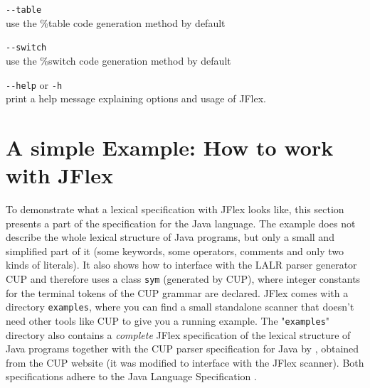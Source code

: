 \documentclass[11pt]{scrartcl}
\newcommand{\trit}{\em}
\begin{document}
\begin{description}
\item \verb+--table+\\
  use the \%table code generation method by default

\item \verb+--switch+\\
  use the \%switch code generation method by default

\item \verb+--help+ or \texttt{-h}\\
  print a help message explaining options and usage of JFlex.
\end{description}

\section{A simple Example: How to work with JFlex\label{Example}}
To demonstrate what a lexical specification with JFlex looks like, this
section presents a part of the specification for the Java language.
The example does not describe the whole lexical structure of Java programs,
but only a small and simplified part of it (some keywords, some operators,
comments and only two kinds of literals). It also shows how to interface
with the LALR parser generator CUP \cite{CUP} and therefore
uses a class \texttt{sym} (generated by CUP), where integer constants for
the terminal tokens of the CUP grammar are declared. JFlex comes with a
directory \texttt{examples}, where you can find a small standalone scanner
that doesn't need other tools like CUP to give you a running example.
The "\texttt{examples}" directory also contains a {\trit complete} JFlex 
specification of the lexical structure of Java programs together with the 
CUP parser specification for Java by 
, obtained
from the CUP \cite{CUP} website (it was modified to interface with the JFlex scanner). 
Both specifications adhere to the Java Language Specification \cite{LangSpec}.
\end{document}
